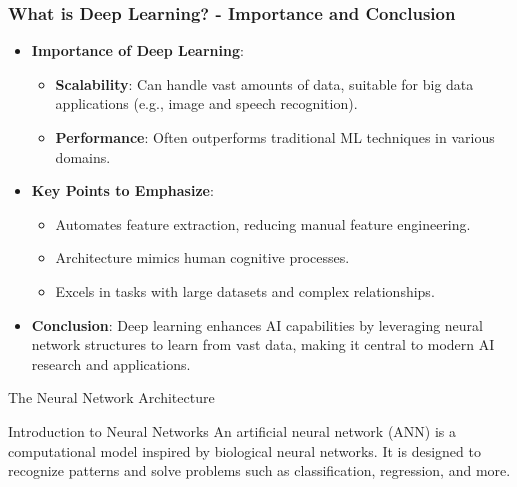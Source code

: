 \documentclass[aspectratio=169]{beamer}
\begin{document}
\begin{frame}[fragile]
    \frametitle{What is Deep Learning? - Importance and Conclusion}
    \begin{itemize}
        \item \textbf{Importance of Deep Learning}:
            \begin{itemize}
                \item \textbf{Scalability}: Can handle vast amounts of data, suitable for big data applications (e.g., image and speech recognition).
                \item \textbf{Performance}: Often outperforms traditional ML techniques in various domains.
            \end{itemize}
        \item \textbf{Key Points to Emphasize}:
            \begin{itemize}
                \item Automates feature extraction, reducing manual feature engineering.
                \item Architecture mimics human cognitive processes.
                \item Excels in tasks with large datasets and complex relationships.
            \end{itemize}
        \item \textbf{Conclusion}: Deep learning enhances AI capabilities by leveraging neural network structures to learn from vast data, making it central to modern AI research and applications.
    \end{itemize}
\end{frame}

\begin{frame}[fragile]{The Neural Network Architecture}
  \begin{block}{Introduction to Neural Networks}
    An artificial neural network (ANN) is a computational model inspired by biological neural networks. 
    It is designed to recognize patterns and solve problems such as classification, regression, and more.
  \end{block}
\end{frame}
\end{document}
